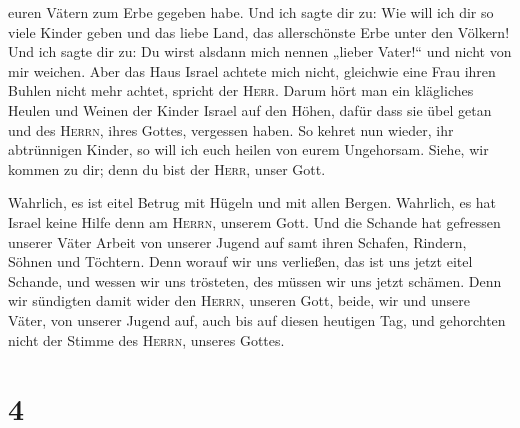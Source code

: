 euren Vätern zum Erbe gegeben habe.  Und ich sagte dir
zu: Wie will ich dir so viele Kinder geben und das liebe Land, das
allerschönste Erbe unter den Völkern! Und ich sagte dir zu: Du wirst
alsdann mich nennen „lieber Vater!{}`` und nicht von mir weichen.
 Aber das Haus Israel achtete mich nicht, gleichwie eine
Frau ihren Buhlen nicht mehr achtet, spricht der \textsc{Herr}.
 Darum hört man ein klägliches Heulen und Weinen der
Kinder Israel auf den Höhen, dafür dass sie übel getan und des
\textsc{Herrn}, ihres Gottes, vergessen haben.  So kehret
nun wieder, ihr abtrünnigen Kinder, so will ich euch heilen von eurem
Ungehorsam. Siehe, wir kommen zu dir; denn du bist der \textsc{Herr},
unser Gott.

 Wahrlich, es ist eitel Betrug mit Hügeln und mit allen
Bergen. Wahrlich, es hat Israel keine Hilfe denn am \textsc{Herrn},
unserem Gott.  Und die Schande hat gefressen unserer
Väter Arbeit von unserer Jugend auf samt ihren Schafen, Rindern, Söhnen
und Töchtern.  Denn worauf wir uns verließen, das ist uns
jetzt eitel Schande, und wessen wir uns trösteten, des müssen wir uns
jetzt schämen. Denn wir sündigten damit wider den \textsc{Herrn},
unseren Gott, beide, wir und unsere Väter, von unserer Jugend auf, auch
bis auf diesen heutigen Tag, und gehorchten nicht der Stimme des
\textsc{Herrn}, unseres Gottes.

\hypertarget{section-3}{%
\section{4}\label{section-3}}

